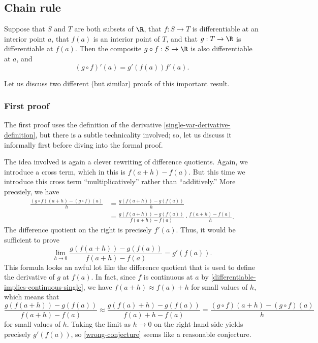 \subsection{Chain rule} \label{chain-rule-single-section}

\begin{proposition} \label{chain-rule-single}
	Suppose that $S$ and $T$ are both subsets of $\R$, that $f : S \to T$ is differentiable at an interior point $a$, that $f(a)$ is an interior point of $T$, and that $g : T \to \R$ is differentiable at $f(a)$. Then the composite $g \circ f : S \to \R$ is also differentiable at $a$, and 
	\[ (g \circ f)'(a) = g'(f(a))f'(a). \]
\end{proposition}

Let us discuss two different (but similar) proofs of this important result. 

\subsubsection*{First proof}

The first proof uses the definition of the derivative \ref{single-var-derivative-definition}, but there is a subtle technicality involved; so, let us discuss it informally first before diving into the formal proof.  

The idea involved is again a clever rewriting of difference quotients. Again, we introduce a cross term, which in this is $f(a+h) - f(a)$. But this time we introduce this cross term ``multiplicatively'' rather than ``additively.'' More precsiely, we have
\[ \begin{aligned} \frac{(g \circ f)(a+h) - (g \circ f)(a)}{h} &= \frac{g(f(a+h)) - g(f(a))}{h} \\ &= \frac{g(f(a+h)) - g(f(a))}{f(a+h)-f(a)} \cdot \frac{f(a+h)-f(a)}{h}. \end{aligned} \]
The difference quotient on the right is precisely $f'(a)$. Thus, it would be sufficient to prove  
\begin{equation} \label{wrong-conjecture} \lim_{h \to 0} \frac{g(f(a+h)) - g(f(a))}{f(a+h)-f(a)} = g'(f(a)). \end{equation}
This formula looks an awful lot like the difference quotient that is used to define the derivative of $g$ at $f(a)$. In fact, since $f$ is continuous at $a$ by \cref{differentiable-implies-continuous-single}, we have $f(a+h) \approx f(a)+h$ for small values of $h$, which means that
\[ \frac{g(f(a+h)) - g(f(a))}{f(a+h)-f(a)} \approx \frac{g(f(a)+h) - g(f(a))}{f(a)+h-f(a)} = \frac{(g \circ f)(a+h) - (g\circ f)(a)}{h} \]
for small values of $h$. Taking the limit as $h \to 0$ on the right-hand side yields precisely $g'(f(a))$, so \cref{wrong-conjecture} seems like a reasonable conjecture. 


